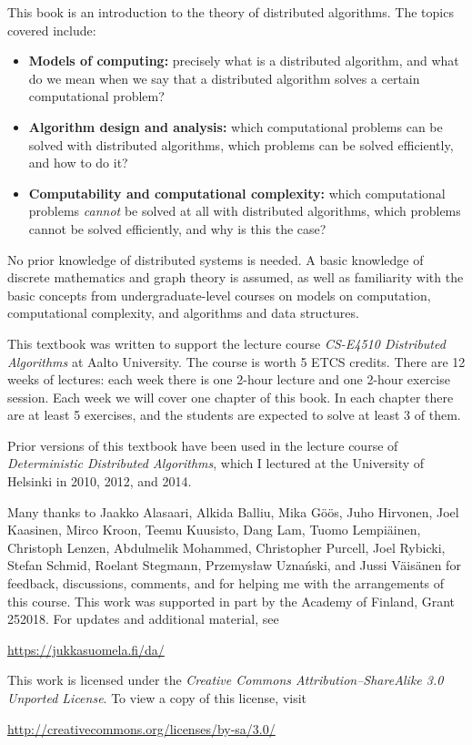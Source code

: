 
This book is an introduction to the theory of distributed algorithms. The topics covered include:
\begin{itemize}
    \item \textbf{Models of computing:} precisely what is a distributed algorithm, and what do we mean when we say that a distributed algorithm solves a certain computational problem?
    \item \textbf{Algorithm design and analysis:} which computational problems can be solved with distributed algorithms, which problems can be solved efficiently, and how to do it?
    \item \textbf{Computability and computational complexity:} which computational problems \emph{cannot} be solved at all with distributed algorithms, which problems cannot be solved efficiently, and why is this the case?
\end{itemize}
No prior knowledge of distributed systems is needed. A basic knowledge of discrete mathematics and graph theory is assumed, as well as familiarity with the basic concepts from undergraduate-level courses on models on computation, computational complexity, and algorithms and data structures.



This textbook was written to support the lecture course \emph{CS-E4510 Distributed Algorithms} at Aalto University. The course is worth 5 ETCS credits. There are 12 weeks of lectures: each week there is one 2-hour lecture and one 2-hour exercise session. Each week we will cover one chapter of this book. In each chapter there are at least 5 exercises, and the students are expected to solve at least 3 of them.

Prior versions of this textbook have been used in the lecture course of \emph{Deterministic Distributed Algorithms}, which I lectured at the University of Helsinki in 2010, 2012, and 2014.



Many thanks to Jaakko Alasaari, Alkida Balliu, Mika G\"o\"os, Juho Hirvonen, Joel Kaasinen, Mirco Kroon, Tee\-mu Kuu\-sisto, Dang Lam, Tuo\-mo Lem\-pi\"a\-inen, Christoph Lenzen, Abdulmelik Mohammed, Christopher Purcell, Joel Rybicki, Stefan Schmid, Roelant Stegmann, Przemys\l{}aw Uzna\'nski, and Jussi V\"ai\-s\"a\-nen for feedback, discussions, comments, and for helping me with the arrangements of this course. This work was supported in part by the Academy of Finland, Grant 252018. For updates and additional material, see
\begin{center}
    \url{https://jukkasuomela.fi/da/}
\end{center}



\begin{samepage}
This work is licensed under the \emph{Creative Commons Attribution--ShareAlike 3.0 Unported License}. To view a copy of this license, visit
\begin{center}
    \url{http://creativecommons.org/licenses/by-sa/3.0/}
\end{center}
\end{samepage}
